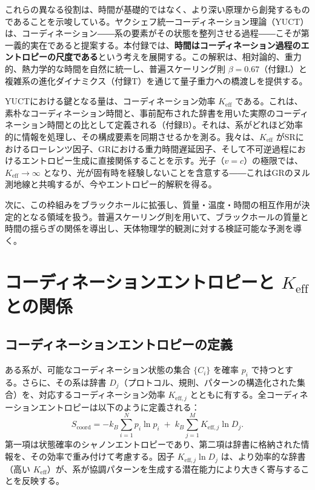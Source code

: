 \documentclass[12pt,a4paper]{article}
\newcommand{\Keff}{K_{\mathrm{eff}}}
\newcommand{\Keffi}[1]{K_{\mathrm{eff},#1}}
\newcommand{\Scoord}{S_{\mathrm{coord}}}
\begin{document}
	これらの異なる役割は、時間が基礎的ではなく、より深い原理から創発するものであることを示唆している。ヤクシェフ統一コーディネーション理論（YUCT）は、コーディネーション――系の要素がその状態を整列させる過程――こそが第一義的実在であると提案する。本付録では、\textbf{時間はコーディネーション過程のエントロピーの尺度である}という考えを展開する。この解釈は、相対論的、重力的、熱力学的な時間を自然に統一し、普遍スケーリング則 \(\beta = 0.67\)（付録L）と複雑系の進化ダイナミクス（付録T）を通じて量子重力への橋渡しを提供する。
	
	YUCTにおける鍵となる量は、コーディネーション効率 \(\Keff\) である。これは、素朴なコーディネーション時間と、事前配布された辞書を用いた実際のコーディネーション時間との比として定義される（付録B）。それは、系がどれほど効率的に情報を処理し、その構成要素を同期させるかを測る。我々は、\(\Keff\) がSRにおけるローレンツ因子、GRにおける重力時間遅延因子、そして不可逆過程におけるエントロピー生成に直接関係することを示す。光子（\(v=c\)）の極限では、\(\Keff \to \infty\) となり、光が固有時を経験しないことを含意する――これはGRのヌル測地線と共鳴するが、今やエントロピー的解釈を得る。
	
	次に、この枠組みをブラックホールに拡張し、質量・温度・時間の相互作用が決定的となる領域を扱う。普遍スケーリング則を用いて、ブラックホールの質量と時間の揺らぎの関係を導出し、天体物理学的観測に対する検証可能な予測を導く。
	
	\section{コーディネーションエントロピーと \(\Keff\) との関係}
	\label{sec:coord_entropy}
	
	\subsection{コーディネーションエントロピーの定義}
	
	ある系が、可能なコーディネーション状態の集合 \(\{C_i\}\) を確率 \(p_i\) で持つとする。さらに、その系は辞書 \(D_j\)（プロトコル、規則、パターンの構造化された集合）を、対応するコーディネーション効率 \(\Keffi{j}\) とともに有する。全コーディネーションエントロピーは以下のように定義される：
	\begin{equation}
		\Scoord = -k_B \sum_{i=1}^{N} p_i \ln p_i \;+\; k_B \sum_{j=1}^{M} \Keffi{j} \ln D_j.
		\label{eq:coord_entropy_def}
	\end{equation}
	第一項は状態確率のシャノンエントロピーであり、第二項は辞書に格納された情報を、その効率で重み付けて考慮する。因子 \(\Keffi{j} \ln D_j\) は、より効率的な辞書（高い \(\Keff\)）が、系が協調パターンを生成する潜在能力により大きく寄与することを反映する。
	
\end{document}
